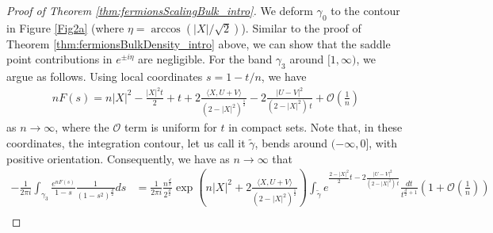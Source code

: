 \documentclass[%
 jmp,
cp,  %
 amsmath,amsthm,amssymb,%
 reprint,%
onecolumn]{revtex4-2}
\newtheorem{theorem}{Theorem}[section]
\begin{document}

\begin{proof}[Proof of Theorem \ref{thm:fermionsScalingBulk_intro}]
We deform $\gamma_0$ to the contour in Figure \ref{Fig2a} (where $\eta = \arccos(\lvert X\rvert/\sqrt 2)$). Similar to the proof of Theorem \ref{thm:fermionsBulkDensity_intro} above, we can show that the saddle point contributions in $e^{\pm i \eta}$ are negligible. For the band $\gamma_3$ around $[1,\infty)$, we argue as follows. Using local coordinates $s=1-t/n$, we have
\begin{align} \label{eq:fermionsScalingBulk1}
n F(s) = n \lvert X\rvert^2 - \frac{\lvert X\rvert^2 t}{2} + t 
+2\frac{\langle X,U+V\rangle}{(2-|X|^2)^{\frac12}}
- 2\frac{\lvert U-V\rvert^2}{(2-\lvert X\rvert^2)\, t} + \mathcal O\left(\frac{1}{n}\right)
\end{align}
as $n\to\infty$, where the $\mathcal O$ term is uniform for $t$ in compact sets. Note that, in these coordinates, the integration contour, let us call it $\tilde\gamma$, 
bends around $(-\infty, 0]$, with positive orientation. 
Consequently, we have as $n\to\infty$ that
\begin{align*}
-\frac{1}{2\pi i}\int_{\gamma_3} \frac{e^{n F(s)}}{1-s} \frac{1}{(1-s^2)^\frac{d}{2}} ds
&= \frac{1}{2\pi i} \frac{n^{\frac{d}{2}}}{2^\frac{d}{2}} 
\exp\left(n\lvert X\rvert^2+2\frac{\langle X,U+V\rangle}{(2-|X|^2)^{\frac12}}\right)
\int_{\tilde\gamma} e^{\frac{2-\lvert X\rvert^2}{2} t - 2\frac{\lvert U-V\rvert^2}{(2-\lvert X\rvert^2)\, t}} \frac{dt}{t^{\frac{d}{2}+1}}\left(1+ \mathcal O\left(\frac{1
}{n}\right)\right)\\

\end{align*}
\end{proof}
\end{document}
